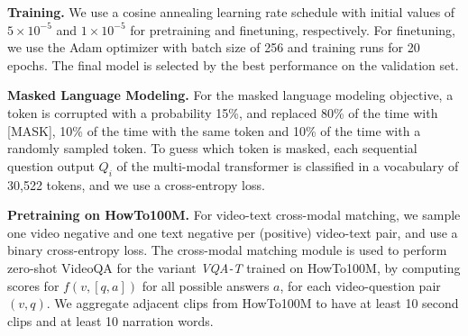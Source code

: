 \begin{table}[t]
\begin{center}
\setlength\tabcolsep{4pt}
\end{center}
\vspace{-0.5cm}
\caption{\small Comparison of \textit{\qat{}} and \textit{\vqat{}} models trained from scratch (without pretraining) on downstream datasets.}
\vspace{-0.3cm}
\label{table:bias}
\end{table} 

\noindent \textbf{Training.} We use a cosine annealing learning rate schedule with initial values of $5 \times 10^{-5}$ and $1 \times 10^{-5}$ for pretraining and finetuning, respectively. For finetuning, we use the Adam optimizer with batch size of 256 and training runs for 20 epochs. The final model is selected by the best performance on the validation set.

\noindent \textbf{Masked Language Modeling.} For the masked language modeling objective, a token is corrupted with a probability 15\%, and replaced 80\% of the time with [MASK], 10\% of the time with the same token and 10\% of the time with a randomly sampled token. 
To guess which token is masked, each sequential question output $Q_i$ of the multi-modal transformer is classified in a vocabulary of 30,522 tokens, and we use a cross-entropy loss.


\noindent \textbf{Pretraining on HowTo100M.} For video-text cross-modal matching, we sample one video negative and one text negative per (positive) video-text pair, and use a binary cross-entropy loss. 
The cross-modal matching module is used to perform zero-shot VideoQA for the variant \textit{VQA-T} trained on HowTo100M, by computing scores for $f(v,[q,a])$ for all possible answers $a$, for each video-question pair $(v,q)$.
We aggregate adjacent clips from HowTo100M to have at least 10 second clips and at least 10 narration words. 



